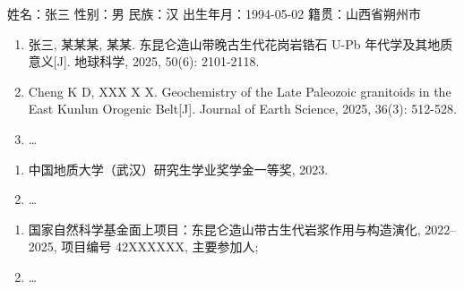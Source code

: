 
%
%

姓名：张三 \quad 性别：男 \quad 民族：汉 \quad 出生年月：1994-05-02 \quad 籍贯：山西省朔州市


    \begin{enumerate}
        \item 张三, 某某某, 某某. 东昆仑造山带晚古生代花岗岩锆石 U-Pb 年代学及其地质意义[J]. 地球科学, 2025, 50(6): 2101-2118.
        \item Cheng K D, XXX X X. Geochemistry of the Late Paleozoic granitoids in the East Kunlun Orogenic Belt[J]. Journal of Earth Science, 2025, 36(3): 512-528.
        \item \dots
    \end{enumerate}

    \begin{enumerate}
        \item 中国地质大学（武汉）研究生学业奖学金一等奖, 2023.
        \item \dots
    \end{enumerate}

    \begin{enumerate}
        \item 国家自然科学基金面上项目：东昆仑造山带古生代岩浆作用与构造演化, 2022--2025, 项目编号 42XXXXXX, 主要参加人;
        \item \dots
    \end{enumerate}

\endinput
